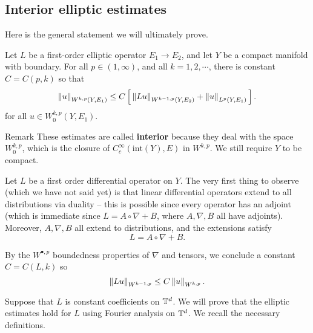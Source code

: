   \subsection*{Interior elliptic estimates}
  Here is the general statement we will ultimately prove.
  \begin{thm}
    Let $L$ be a first-order elliptic operator $E_{1}\to E_{2}$, and let $Y$ be a compact manifold with boundary. For all $p\in (1,\infty)$, and all $k=1,2,\cdots$, there is constant $C=C(p,k)$ so that
    \begin{equation*}
      \left\lVert u\right\rVert_{W^{k,p}(Y,E_{1})}\le C\left[\,\left\lVert L u\right\rVert_{W^{k-1,p}(Y,E_{2})}+\left\lVert u\right\rVert_{L^{p}(Y,E_{1})}\,\right].
    \end{equation*}
    for all $u\in W^{k,p}_{0}(Y,E_{1})$. 
  \end{thm}
  \begin{clear}{Remark}
    These estimates are called \textbf{interior} because they deal with the space $W^{k,p}_{0}$, which is the closure of $C^{\infty}_{c}(\text{int}(Y),E)$ in $W^{k,p}$. We still require $Y$ to be compact.
  \end{clear}
  \begin{xca}
    Let $L$ be a first order differential operator on $Y$. The very first thing to observe (which we have not said yet) is that linear differential operators extend to all distributions via duality -- this is possible since every operator has an adjoint (which is immediate since $L=A\circ \nabla+B$, where $A,\nabla,B$ all have adjoints). Moreover, $A,\nabla,B$ all extend to distributions, and the extensions satisfy
    \begin{equation*}
      L=A\circ \nabla+B.
    \end{equation*}

    By the $W^{\bullet,p}$ boundedness properties of $\nabla$ and tensors, we conclude a constant $C=C(L,k)$ so
    \begin{equation*}
      \left\lVert Lu\right\rVert_{W^{k-1,p}}\le C\left\lVert u\right\rVert_{W^{k,p}}.
    \end{equation*}
  \end{xca}

  Suppose that $L$ is constant coefficients on $\mathbb{T}^{d}$. We will prove that the elliptic estimates hold for $L$ using Fourier analysis on $\mathbb{T}^{d}$. We recall the necessary definitions.

